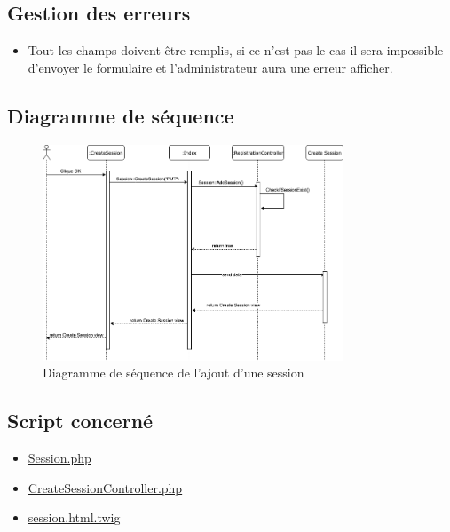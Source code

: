 \newpage
\subsection{Gestion des erreurs}
	\begin{itemize}
		\item Tout les champs doivent être remplis, si ce n'est pas le cas il sera impossible d'envoyer le formulaire et l'administrateur aura une erreur afficher.
	\end{itemize}

\vspace{\baselineskip}
\subsection{Diagramme de séquence}
	\begin{figure}[h]
		\includegraphics[width=0.8\textwidth,center]{Diagramme/sequence-us11}
		\caption{Diagramme de séquence de l'ajout d'une session}
	\end{figure}

\vspace{\baselineskip}
\subsection{Script concerné}
	\begin{itemize}
		\item \href{https://github.com/victorsmits/Aquabike/blob/master/Symfony-Twig/src/Entity/Session.php}{Session.php}
		\item \href{https://github.com/victorsmits/Aquabike/blob/master/Symfony-Twig/src/Controller/CreateSessionController.php}{CreateSessionController.php}
		\item \href{https://github.com/victorsmits/Aquabike/blob/master/Symfony-Twig/templates/create_session/session.html.twig}{session.html.twig}
	\end{itemize}